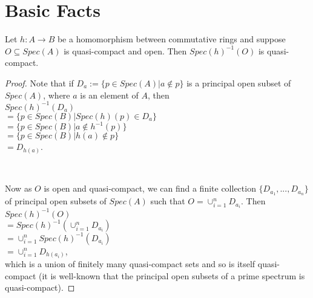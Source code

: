 \chapter{Basic Facts}


\begin{lemma}
  Let $h:A\rightarrow{B}$ be a homomorphism between commutative rings and suppose
  $O\subseteq{Spec}(A)$ is quasi-compact and open. Then $Spec(h)^{-1}(O)$ is quasi-compact.
\end{lemma}
\begin{proof}
  Note that if $D_a:=\{p\in{Spec}(A)|a\notin{p}\}$ is a principal open subset of $Spec(A)$, where
  $a$ is an element of $A$, then
  \\
  $Spec(h)^{-1}(D_a)$
  \\
  $=\{p\in{Spec}(B)|Spec(h)(p)\in{D_a}\}$
  \\
  $=\{p\in{Spec}(B)|a\notin{h}^{-1}(p)\}$
  \\
  $=\{p\in{Spec}(B)|h(a)\notin{p}\}$
  \\
  $=D_{h(a)}$.

  \

  Now as $O$ is open and quasi-compact, we can find a finite collection $\{D_{a_1},...,D_{a_n}\}$
  of principal open subsets of $Spec(A)$ such that $O=\cup_{i=1}^n{D_{a_i}}$. Then
  \\
  $Spec(h)^{-1}(O)$
  \\
  $=Spec(h)^{-1}(\cup_{i=1}^n{D_{a_i}})$
  \\
  $=\cup_{i=1}^n{Spec(h)^{-1}(D_{a_i})}$
  \\
  $=\cup_{i=1}^n{D_{h(a_i)}}$,
  \\
  which is a union of finitely many quasi-compact sets and so is itself quasi-compact (it is
  well-known that the principal open subsets of a prime spectrum is quasi-compact).
\end{proof}
